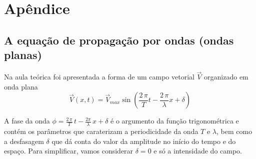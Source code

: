 \documentclass[a4paper,12pt]{article}
\begin{document}

\newpage
\section*{\sf Apêndice}
\subsection{\sf A equação de propagação por ondas (ondas planas)} 

Na aula teórica foi apresentada a forma de um campo vetorial $\vec{V}$ organizado em onda plana 
\begin{equation}
	\label{eq:onda}
	\vec{V}(x,t)=\vec{V}_{max} \sin \left(\frac{2\,\pi}{T}t - \frac{2\,\pi}{\lambda}x + \delta \right)
\end{equation}

A fase da onda $\phi = \frac{2\,\pi}{T}\,t - \frac{2\pi}{\lambda}\,x + \delta$  é o argumento da função trigonométrica e contém os parâmetros que caraterizam a periodicidade da onda $T$ e $\lambda$, bem como a desfasagem $\delta$ que dá conta do valor da amplitude no início do tempo e do espaço. Para simplificar, vamos considerar $\delta=0$ e só a intensidade do campo.
\end{document}

